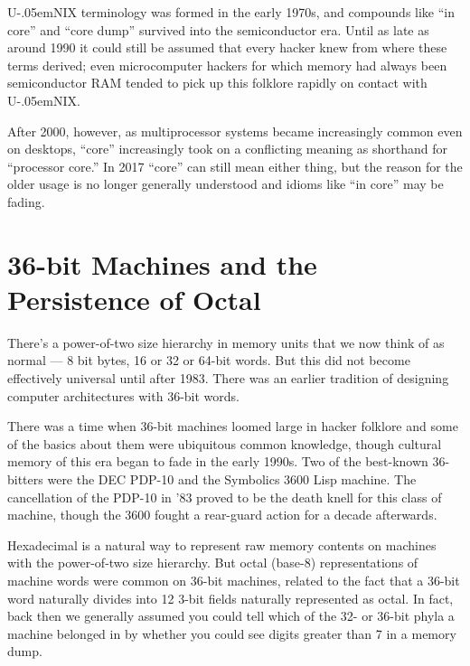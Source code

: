 \documentclass[10pt]{article}
\newcommand{\mc}{\small}
\newcommand{\acro}[1]{{\mc #1\spacefactor1000}}
\def\UNIX/{{\mc U\kern-.05emNIX\spacefactor1000}}%
\begin{document}
\UNIX/ terminology was formed in the early 1970s, and compounds like ``in core''
and ``core dump'' survived into the semiconductor era. Until as late as around
1990 it could still be assumed that every hacker knew from where these terms
derived; even microcomputer hackers for which memory had always been
semiconductor \acro{RAM} tended to pick up this folklore rapidly on contact with \UNIX/.

After 2000, however, as multiprocessor systems became increasingly common even
on desktops, ``core'' increasingly took on a conflicting meaning as shorthand for
``processor core.'' In 2017 ``core'' can still mean either thing, but the reason
for the older usage is no longer generally understood and idioms like ``in core''
may be fading.

\section{36-bit Machines and the Persistence of Octal}
There's a power-of-two size hierarchy in memory units that we now think of as
normal --- 8 bit bytes, 16 or 32 or 64-bit words. But this did not become
effectively universal until after 1983. There was an earlier tradition of
designing computer architectures with 36-bit words.

There was a time when 36-bit machines loomed large in hacker folklore and some
of the basics about them were ubiquitous common knowledge, though cultural
memory of this era began to fade in the early 1990s. Two of the best-known
36-bitters were the \acro{DEC PDP-10} and the Symbolics 3600 Lisp machine. The
cancellation of the \acro{PDP-10} in '83 proved to be the death knell for this class
of machine, though the 3600 fought a rear-guard action for a decade afterwards.

Hexadecimal is a natural way to represent raw memory contents on machines with
the power-of-two size hierarchy. But octal (base-8) representations of machine
words were common on 36-bit machines, related to the fact that a 36-bit word
naturally divides into 12 3-bit fields naturally represented as octal. In fact,
back then we generally assumed you could tell which of the 32- or 36-bit phyla
a machine belonged in by whether you could see digits greater than 7 in a
memory dump.
\end{document}

